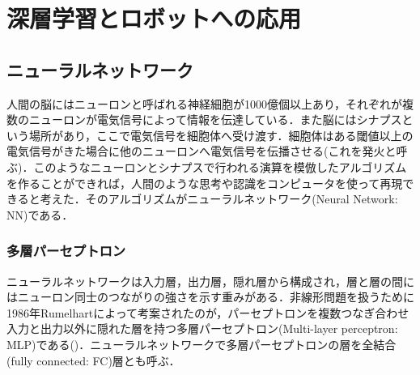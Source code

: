 \chapter{深層学習とロボットへの応用}
\label{chap_review}
\newpage

\section{ニューラルネットワーク}\label{sec:NeuralNetwork}
人間の脳にはニューロンと呼ばれる神経細胞が1000億個以上あり，それぞれが複数のニューロンが電気信号によって情報を伝達している．また脳にはシナプスという場所があり，ここで電気信号を細胞体へ受け渡す．細胞体はある閾値以上の電気信号がきた場合に他のニューロンへ電気信号を伝播させる(これを発火と呼ぶ)．このようなニューロンとシナプスで行われる演算を模倣したアルゴリズムを作ることができれば，人間のような思考や認識をコンピュータを使って再現できると考えた．そのアルゴリズムがニューラルネットワーク(Neural Network: NN)である．

\subsection{多層パーセプトロン}
ニューラルネットワークは入力層，出力層，隠れ層から構成され，層と層の間にはニューロン同士のつながりの強さを示す重みがある．非線形問題を扱うために1986年Rumelhartによって考案されたのが，パーセプトロンを複数つなぎ合わせ入力と出力以外に隠れた層を持つ多層パーセプトロン(Multi-layer perceptron: MLP)である()．ニューラルネットワークで多層パーセプトロンの層を全結合(fully connected: FC)層とも呼ぶ．

